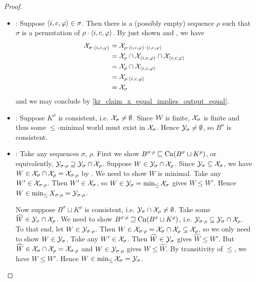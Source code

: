 \begin{proof}
\begin{itemize}
      \item \duprem{}: Suppose $\langle {i, c, \varphi} \rangle \in \sigma$. Then there is a
          (possibly empty) sequence $\rho$ such that $\sigma$ is a permutation
          of $\rho \cdot \langle {i, c, \varphi} \rangle$. By \rearr{} just shown and
          \kconj{}, we have
          \begin{align*}
              \mathcal{X}_{\sigma \cdot \langle {i, c, \varphi} \rangle}
              &= \mathcal{X}_{\rho \cdot \langle {i, c, \varphi} \rangle \cdot \langle {i, c, \varphi} \rangle} \\
              &= \mathcal{X}_\rho \cap \mathcal{X}_{\langle {i, c, \varphi} \rangle} \cap \mathcal{X}_{\langle {i, c, \varphi} \rangle} \\
              &= \mathcal{X}_\rho \cap \mathcal{X}_{\langle {i, c, \varphi} \rangle} \\
              &= \mathcal{X}_{\rho \cdot \langle {i, c, \varphi} \rangle} \\
              &= \mathcal{X}_\sigma
          \end{align*}
          and we may conclude by \cref{kr_claim_x_equal_implies_output_equal}.
    \item \condcons{}: Suppose $K^\sigma$ is consistent,
          i.e. $\mathcal{X}_\sigma \ne \emptyset$. Since $\mathcal{W}$ is finite, $\mathcal{X}_\sigma$ is
          finite and thus some $\le$-minimal world must exist in $\mathcal{X}_\sigma$.
          Hence $\mathcal{Y}_\sigma \ne \emptyset$, so $B^\sigma$ is consistent.
    \item \incvac{}: Take any sequences $\sigma$, $\rho$. First
          we show $B^{\sigma \cdot \rho} \sqsubseteq \operatorname{Cn}(B^\sigma \sqcup
          K^\rho)$, or equivalently, $\mathcal{Y}_{\sigma \cdot \rho} \supseteq
          \mathcal{Y}_\sigma \cap \mathcal{X}_\rho$. Suppose $W \in \mathcal{Y}_\sigma \cap \mathcal{X}_\rho$.
          Since $\mathcal{Y}_\sigma \subseteq \mathcal{X}_\sigma$, we have $W \in \mathcal{X}_\sigma \cap
          \mathcal{X}_\rho = \mathcal{X}_{\sigma \cdot \rho}$ by \kconj{}. We need
          to show $W$ is minimal. Take any $W' \in \mathcal{X}_{\sigma \cdot \rho}$.
          Then $W' \in \mathcal{X}_{\sigma}$, so $W \in \mathcal{Y}_\sigma =
          \min_{\le}{\mathcal{X}_\sigma}$ gives $W \le W'$. Hence $W \in
          \min_{\le}{X_{\sigma \cdot \rho}} = \mathcal{Y}_{\sigma \cdot \rho}$.

          Now suppose $B^\sigma \sqcup K^\rho$ is consistent, i.e. $\mathcal{Y}_\sigma
          \cap \mathcal{X}_\rho \ne \emptyset$. Take some $\widehat{W} \in \mathcal{Y}_\sigma
          \cap \mathcal{X}_\rho$. We need to show $B^{\sigma \cdot \rho} \sqsupseteq
          \operatorname{Cn}(B^\sigma \sqcup K^\rho)$, i.e. $\mathcal{Y}_{\sigma \cdot \rho}
          \subseteq \mathcal{Y}_\sigma \cap \mathcal{X}_\rho$. To that end, let $W \in \mathcal{Y}_{\sigma
          \cdot \rho}$. Then $W \in \mathcal{X}_{\sigma \cdot \rho} = \mathcal{X}_\sigma \cap
          \mathcal{X}_\rho \subseteq \mathcal{X}_\rho$, so we only need to show $W \in
          \mathcal{Y}_\sigma$. Take any $W' \in \mathcal{X}_\sigma$. Then $\widehat{W} \in
          \mathcal{Y}_\sigma$ gives $\widehat{W} \le W'$. But $\widehat{W} \in \mathcal{X}_\sigma
          \cap \mathcal{X}_\rho = \mathcal{X}_{\sigma \cdot \rho}$ and $W \in \mathcal{Y}_{\sigma
          \cdot \rho}$ gives $W \le \widehat{W}$. By transitivity of $\le$,
          we have $W \le W'$.  Hence $W \in \min_{\le}{\mathcal{X}_\sigma} = \mathcal{Y}_\sigma$.


\end{itemize}
\end{proof}
